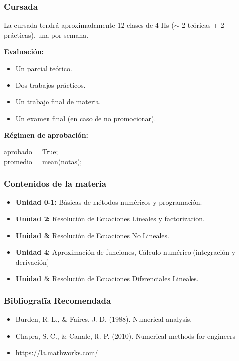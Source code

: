 \documentclass[xcolor=svgnames]{beamer} %
\theoremstyle{plain}
\renewcommand{\textbf}[1]{{\bfseries\textcolor{redUnq2}{#1}}}
\theoremstyle{definition}
\begin{document}
\begin{frame}
	\frametitle{Cursada}
	La cursada tendrá aproximadamente 12 clases de 4 Hs ($\sim$ 2 teóricas + 2 prácticas), una por semana.


	\textbf{Evaluación:}
	\begin{itemize}
		\item Un parcial teórico.
		\item Dos trabajos prácticos.
		\item Un trabajo final de materia.
		\item Un examen final (en caso de no promocionar).
	\end{itemize}


\begin{tcolorbox}
\begin{small}


 \textbf{Régimen de aprobación:}

	\begin{algorithm}	[H]
		aprobado = True;\\
	promedio = mean(notas);\\
	\end{algorithm}	 
\end{small}
\end{tcolorbox}

\end{frame}




\begin{frame}
	\frametitle{Contenidos de la materia}

	\begin{itemize}
		\item \textbf{Unidad 0-1:} Básicas de métodos numéricos y programación.
		\item \textbf{Unidad 2:} Resolución de Ecuaciones Lineales y factorización.
		\item \textbf{Unidad 3:} Resolución de Ecuaciones No Lineales.
		\item \textbf{Unidad 4:} Aproximación de funciones, Cálculo numérico (integración y derivación)
		\item \textbf{Unidad 5:} Resolución de Ecuaciones Diferenciales Lineales.
	\end{itemize}
\end{frame}



\begin{frame}
	\frametitle{Bibliografía Recomendada}
	\begin{itemize}
		\item Burden, R. L., $\&$ Faires, J. D. (1988). Numerical analysis.
		\item Chapra, S. C., $\&$ Canale, R. P. (2010). Numerical methods for engineers
		\item https://la.mathworks.com/
	\end{itemize}
\end{frame}
\end{document}
